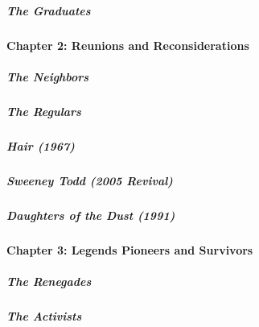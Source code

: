 \hypertarget{the-graduates-1}{%
\subparagraph{The Graduates}\label{the-graduates-1}}

\hypertarget{chapter-2-reunions-and-reconsiderations}{%
\paragraph{Chapter 2: Reunions and
Reconsiderations}\label{chapter-2-reunions-and-reconsiderations}}

\href{/interactive/2020/04/13/t-magazine/ninth-street-greenwich-village-neighbors.html}{}

\hypertarget{the-neighbors}{%
\subparagraph{The Neighbors}\label{the-neighbors}}

\href{/interactive/2020/04/13/t-magazine/omen-restaurant-nyc.html}{}

\hypertarget{the-regulars}{%
\subparagraph{The Regulars}\label{the-regulars}}

\href{/interactive/2020/04/13/t-magazine/hair-musical-broadway.html}{}

\hypertarget{hair-1967}{%
\subparagraph{Hair (1967)}\label{hair-1967}}

\href{/interactive/2020/04/13/t-magazine/sweeney-todd-revival.html}{}

\hypertarget{sweeney-todd-2005-revival}{%
\subparagraph{Sweeney Todd (2005
Revival)}\label{sweeney-todd-2005-revival}}

\href{/interactive/2020/04/13/t-magazine/daughters-of-the-dust.html}{}

\hypertarget{daughters-of-the-dust-1991}{%
\subparagraph{Daughters of the Dust
(1991)}\label{daughters-of-the-dust-1991}}

\hypertarget{chapter-3-legends-pioneers-and-survivors}{%
\paragraph{Chapter 3: Legends Pioneers and
Survivors}\label{chapter-3-legends-pioneers-and-survivors}}

\href{/interactive/2020/04/13/t-magazine/butch-stud-lesbian.html}{}

\hypertarget{the-renegades}{%
\subparagraph{The Renegades}\label{the-renegades}}

\href{/interactive/2020/04/13/t-magazine/act-up-aids.html}{}

\hypertarget{the-activists}{%
\subparagraph{The Activists}\label{the-activists}}

\href{/interactive/2020/04/13/t-magazine/artist-recluse.html}{}

